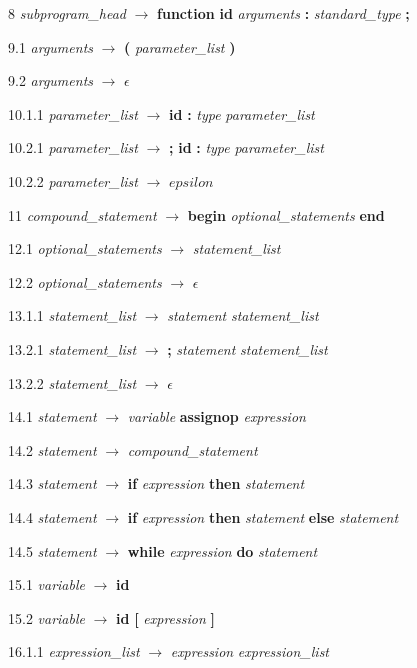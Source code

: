 8    \emph{subprogram\_head} $\rightarrow$ \textbf{function} \textbf{id} \emph{arguments} \textbf{:} \emph{standard\_type} \textbf{;}

9.1  \emph{arguments} $\rightarrow$ \textbf{(} \emph{parameter\_list} \textbf{)}

9.2  \emph{arguments} $\rightarrow$ $\epsilon$

10.1.1 \emph{parameter\_list} $\rightarrow$ \textbf{id} \textbf{:} \emph{type} \emph{parameter\_list\textprime}

10.2.1 \emph{parameter\_list\textprime} $\rightarrow$ \textbf{;} \textbf{id} \textbf{:} \emph{type} \emph{parameter\_list\textprime}

10.2.2 \emph{parameter\_list\textprime} $\rightarrow$ $epsilon$

11   \emph{compound\_statement} $\rightarrow$ \textbf{begin} \emph{optional\_statements} \textbf{end}

12.1 \emph{optional\_statements} $\rightarrow$ \emph{statement\_list}

12.2 \emph{optional\_statements} $\rightarrow$ $\epsilon$

13.1.1 \emph{statement\_list} $\rightarrow$ \emph{statement} \emph{statement\_list\textprime}

13.2.1 \emph{statement\_list\textprime} $\rightarrow$ \textbf{;} \emph{statement} \emph{statement\_list\textprime}

13.2.2 \emph{statement\_list\textprime} $\rightarrow$ $\epsilon$

14.1 \emph{statement} $\rightarrow$ \emph{variable} \textbf{assignop} \emph{expression}

14.2 \emph{statement} $\rightarrow$ \emph{compound\_statement}

14.3 \emph{statement} $\rightarrow$ \textbf{if} \emph{expression} \textbf{then} \emph{statement}

14.4 \emph{statement} $\rightarrow$ \textbf{if} \emph{expression} \textbf{then} \emph{statement} \textbf{else} \emph{statement}

14.5 \emph{statement} $\rightarrow$ \textbf{while} \emph{expression} \textbf{do} \emph{statement}

15.1 \emph{variable} $\rightarrow$ \textbf{id}

15.2 \emph{variable} $\rightarrow$ \textbf{id} \textbf{[} \emph{expression} \textbf{]}

16.1.1 \emph{expression\_list} $\rightarrow$ \emph{expression} \emph{expression\_list\textprime}

